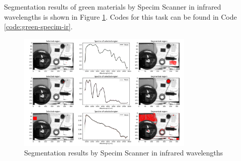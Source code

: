 Segmentation results of green materials by Specim Scanner in infrared
wavelengths is shown in Figure \ref{fig:green-specim-ir}.
Codes for this task can be found in Code \ref{code:green-specim-ir}.
\begin{figure}[H]
  \centering
  \caption{Segmentation results by Specim Scanner in infrared wavelengths}
  \label{fig:green-specim-ir}
  \includegraphics[width=0.75\textwidth]{./fig/task1/specim-scanner-ir.png}
\end{figure}
